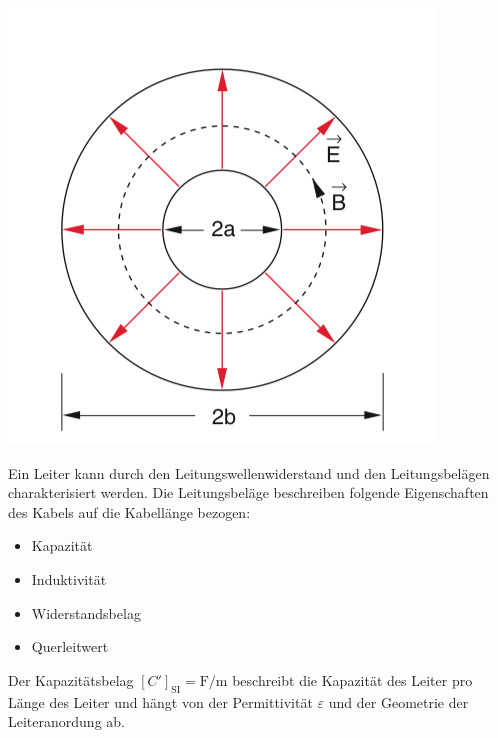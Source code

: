 \documentclass[11pt,ngerman]{scrartcl}
\begin{document}
\begin{center}
	\begin{minipage}[t]{0.5\textwidth}
		\includegraphics[width=\textwidth]{kabel}
		\label{fig:kabel}
	\end{minipage}
\end{center}



\noindent Ein Leiter kann durch den Leitungswellenwiderstand und den Leitungsbelägen
charakterisiert werden. Die Leitungsbeläge beschreiben folgende Eigenschaften
des Kabels auf die Kabellänge bezogen:

\begin{itemize}
	\item Kapazität
	\item Induktivität
	\item Widerstandsbelag
	\item Querleitwert
\end{itemize}


\noindent Der Kapazitätsbelag $[C']_{\text{SI}} = \si{\farad\per\meter}$ beschreibt die
Kapazität des Leiter pro Länge des Leiter und hängt von der Permittivität
$\varepsilon$ und der Geometrie der Leiteranordung ab.
\end{document}
